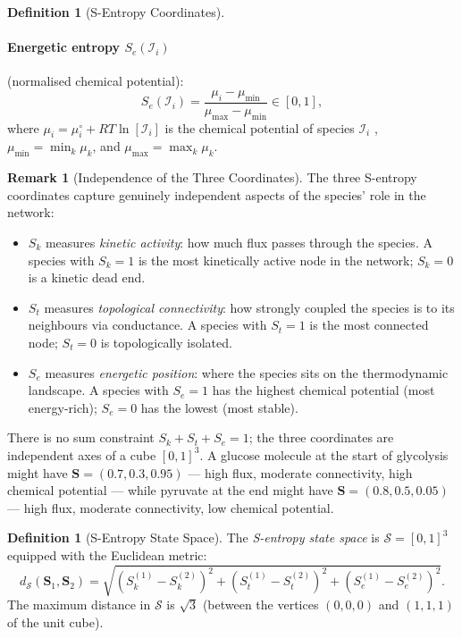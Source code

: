 \documentclass[11pt,twocolumn]{article}
\theoremstyle{plain}
\theoremstyle{definition}
\newtheorem{definition}[theorem]{Definition}
\newtheorem{remark}[theorem]{Remark}
\newcommand{\Sk}{S_k}
\newcommand{\St}{S_t}
\newcommand{\Se}{S_e}
\newcommand{\bS}{\mathbf{S}}
\newcommand{\dS}{d_{\mathcal{S}}}
\begin{document}
\begin{definition}[S-Entropy Coordinates]
\paragraph{Energetic entropy $\Se(\mathcal{I}_i)$} (normalised chemical potential):
\begin{equation}\label{eq:Se}
  \Se(\mathcal{I}_i)
  = \frac{\mu_i - \mu_{\min}}{\mu_{\max} - \mu_{\min}}
  \in [0,1],
\end{equation}
where $\mu_i = \mu_i^\circ + RT \ln[\mathcal{I}_i]$ is the chemical potential
of species $\mathcal{I}_i$ \cite{atkins2014physical, alberty2003thermodynamics},
$\mu_{\min} = \min_k \mu_k$, and $\mu_{\max} = \max_k \mu_k$.
\end{definition}

\begin{remark}[Independence of the Three Coordinates]
\label{rem:independence}
The three S-entropy coordinates capture genuinely independent aspects of the
species' role in the network:
\begin{itemize}
\item $\Sk$ measures \emph{kinetic activity}: how much flux passes through the
  species. A species with $\Sk = 1$ is the most kinetically active node in the
  network; $\Sk = 0$ is a kinetic dead end.
\item $\St$ measures \emph{topological connectivity}: how strongly coupled the
  species is to its neighbours via conductance. A species with $\St = 1$ is the
  most connected node; $\St = 0$ is topologically isolated.
\item $\Se$ measures \emph{energetic position}: where the species sits on the
  thermodynamic landscape. A species with $\Se = 1$ has the highest chemical
  potential (most energy-rich); $\Se = 0$ has the lowest (most stable).
\end{itemize}
There is no sum constraint $\Sk + \St + \Se = 1$; the three coordinates are
independent axes of a cube $[0,1]^3$. A glucose molecule at the start of
glycolysis might have $\bS = (0.7, 0.3, 0.95)$ --- high flux, moderate
connectivity, high chemical potential --- while pyruvate at the end might have
$\bS = (0.8, 0.5, 0.05)$ --- high flux, moderate connectivity, low chemical
potential.
\end{remark}

\begin{definition}[S-Entropy State Space]
\label{def:state_space}
The \emph{S-entropy state space} is $\mathcal{S} = [0,1]^3$ equipped with the
Euclidean metric:
\begin{equation}\label{eq:dS}
  \dS(\bS_1, \bS_2)
  = \sqrt{(\Sk^{(1)} - \Sk^{(2)})^2
        + (\St^{(1)} - \St^{(2)})^2
        + (\Se^{(1)} - \Se^{(2)})^2}.
\end{equation}
The maximum distance in $\mathcal{S}$ is $\sqrt{3}$ (between the vertices
$(0,0,0)$ and $(1,1,1)$ of the unit cube).
\end{definition}
\end{document}
